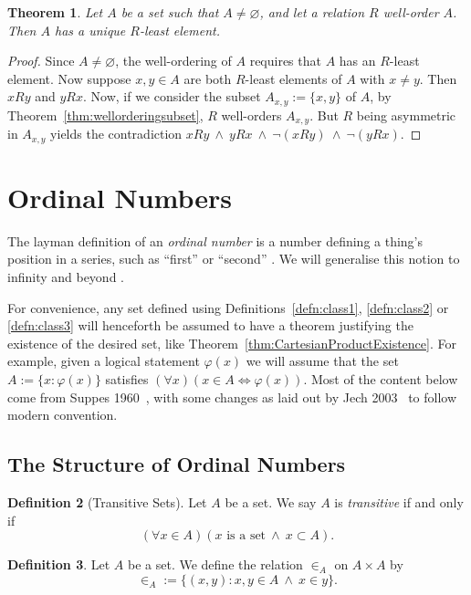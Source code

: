 \documentclass[a4paper,11pt]{article}
\theoremstyle{plain}
\newtheorem{thm}{Theorem}[subsection]
\theoremstyle{definition}
\newtheorem{defn}[thm]{Definition}
\theoremstyle{remark}
\begin{document}
\begin{thm}
\label{thm:uniqueleast}
Let $A$ be a set such that $A\neq\varnothing$, and let a relation $R$ well-order $A$. Then $A$ has a unique $R$-least element.
\end{thm}
\begin{proof}
Since $A \neq \varnothing$, the well-ordering of $A$ requires that $A$ has an $R$-least element. Now suppose $x,y\in A$ are both $R$-least elements of $A$ with $x\neq y$. Then $xRy$ and $yRx$. Now, if we consider the subset $A_{x,y} := \{x,y\}$ of $A$, by Theorem~\ref{thm:wellorderingsubset}, $R$ well-orders $A_{x,y}$. But $R$ being asymmetric in $A_{x,y}$ yields the contradiction $xRy\ \land\ yRx\ \land\ \lnot(xRy)\ \land\ \lnot(yRx)$.
\end{proof}

\pagebreak

\section{Ordinal Numbers}
\label{sec:OrdinalNumbers}
The layman definition of an \textit{ordinal number} is a number defining a thing's position in a series, such as ``first'' or ``second'' \citep{Dictionary}. We will generalise this notion to infinity and beyond \citep{ToyStory}.

For convenience, any set defined using Definitions~\ref{defn:class1}, \ref{defn:class2} or \ref{defn:class3} will henceforth be assumed to have a theorem justifying the existence of the desired set, like Theorem~\ref{thm:CartesianProductExistence}. For example, given a logical statement $\varphi(x)$ we will assume that the set $A := \{x : \varphi(x)\}$ satisfies $(\forall x)(x \in A \iff \varphi(x))$. Most of the content below come from Suppes 1960~\citep{SuppesBook}, with some changes as laid out by Jech 2003~\citep{JechBook} to follow modern convention.

\subsection{The Structure of Ordinal Numbers}
\begin{defn}[Transitive Sets]
\label{defn:transitive}
Let $A$ be a set. We say $A$ is \textit{transitive} if and only if
\[(\forall x\in A)(x \text{ is a set}\ \land \ x\subset A).\]
\end{defn}

\begin{defn}
Let $A$ be a set. We define the relation $\in_A$ on $A\times A$ by
\[\in_A := \{(x,y) : x,y\in A \ \land \ x\in y\}.\]
\end{defn}
\end{document}
